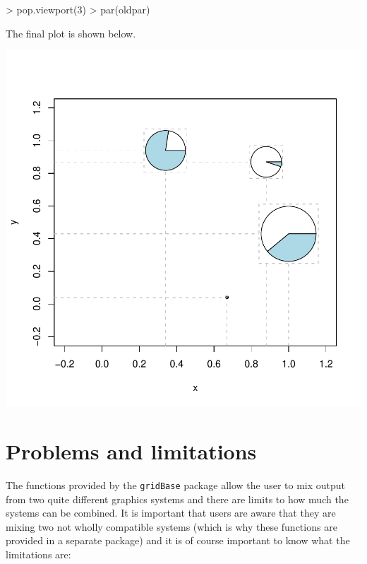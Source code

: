 \documentclass[a4paper]{article}
\newcommand{\gridBase}{{\tt gridBase}}
\begin{document}
\begin{Schunk}
\begin{Sinput}
> pop.viewport(3)
> par(oldpar)
\end{Sinput}
\end{Schunk}
The final plot is shown below.

\includegraphics{gridBase-complex}
\section*{Problems and limitations}

The functions provided by the \gridBase{} package allow the user
to mix output from two quite different graphics systems and there 
are limits to how much the systems can be combined.  It is important
that users are aware that they are mixing two not wholly compatible
systems (which is why these functions are provided in a separate 
package) and it is of course important to know what the limitations
are: 
\end{document}
